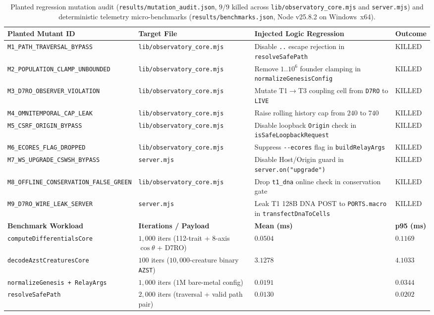 \documentclass[11pt,reqno]{amsart}
\theoremstyle{definition}
\newcommand{\code}[1]{{\footnotesize\nolinkurl{#1}}}
\newcommand{\tcode}[1]{{\scriptsize\nolinkurl{#1}}}
\begin{document}
\begin{table}[t]
\centering
\caption{Planted regression mutation audit (\code{results/mutation\_audit.json}, $9/9$ killed across \code{lib/observatory\_core.mjs} and \code{server.mjs}) and deterministic telemetry micro-benchmarks (\code{results/benchmarks.json}, Node v25.8.2 on Windows~x64).}
\label{tab:mutants}
\scriptsize
\setlength{\tabcolsep}{3.5pt}
\renewcommand{\arraystretch}{1.15}
\begin{tabularx}{\textwidth}{@{}P{4.25cm}P{2.55cm}YP{1.35cm}@{}}
\toprule
\textbf{Planted Mutant ID} & \textbf{Target File} & \textbf{Injected Logic Regression} & \textbf{Outcome} \\
\midrule
\tcode{M1_PATH_TRAVERSAL_BYPASS} & \tcode{lib/observatory_core.mjs} & Disable \tcode{..} escape rejection in \tcode{resolveSafePath} & KILLED \\
\tcode{M2_POPULATION_CLAMP_UNBOUNDED} & \tcode{lib/observatory_core.mjs} & Remove $1..10^6$ founder clamping in \tcode{normalizeGenesisConfig} & KILLED \\
\tcode{M3_D7RO_OBSERVER_VIOLATION} & \tcode{lib/observatory_core.mjs} & Mutate T1$\to$T3 coupling cell from \tcode{D7RO} to \tcode{LIVE} & KILLED \\
\tcode{M4_OMNITEMPORAL_CAP_LEAK} & \tcode{lib/observatory_core.mjs} & Raise rolling history cap from $240$ to $740$ & KILLED \\
\tcode{M5_CSRF_ORIGIN_BYPASS} & \tcode{lib/observatory_core.mjs} & Disable loopback \tcode{Origin} check in \tcode{isSafeLoopbackRequest} & KILLED \\
\tcode{M6_ECORES_FLAG_DROPPED} & \tcode{lib/observatory_core.mjs} & Suppress \tcode{--ecores} flag in \tcode{buildRelayArgs} & KILLED \\
\tcode{M7_WS_UPGRADE_CSWSH_BYPASS} & \tcode{server.mjs} & Disable Host/Origin guard in \tcode{server.on("upgrade")} & KILLED \\
\tcode{M8_OFFLINE_CONSERVATION_FALSE_GREEN} & \tcode{lib/observatory_core.mjs} & Drop \tcode{t1\_dna} online check in conservation gate & KILLED \\
\tcode{M9_D7RO_WIRE_LEAK_SERVER} & \tcode{server.mjs} & Leak T1 128B DNA POST to \tcode{PORTS.macro} in \tcode{transfectDnaToCells} & KILLED \\
\midrule
\textbf{Benchmark Workload} & \textbf{Iterations / Payload} & \textbf{Mean (ms)} & \textbf{p95 (ms)} \\
\midrule
\tcode{computeDifferentialsCore} & $1{,}000$ iters (112-trait + 8-axis $\cos\theta$ + D7RO) & $0.0504$ & $0.1169$ \\
\tcode{decodeAzstCreaturesCore} & $100$ iters ($10{,}000$-creature binary \tcode{AZST}) & $3.1278$ & $4.1033$ \\
\tcode{normalizeGenesis + RelayArgs} & $1{,}000$ iters ($1\text{M}$ bare-metal config) & $0.0191$ & $0.0344$ \\
\tcode{resolveSafePath} & $2{,}000$ iters (traversal + valid path pair) & $0.0130$ & $0.0202$ \\
\bottomrule
\end{tabularx}
\end{table}
\end{document}
